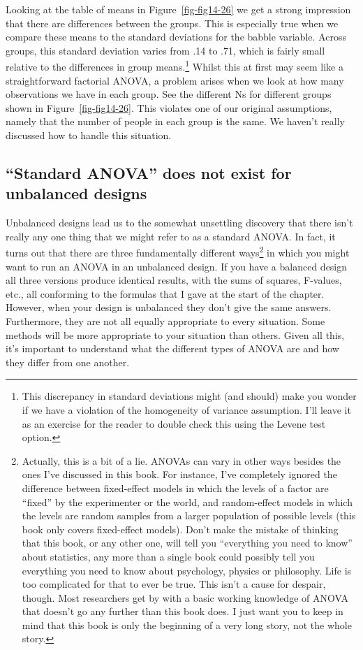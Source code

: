 \documentclass[
  a4paper,
]{book}
\begin{document}
Looking at the table of means in Figure~\ref{fig-fig14-26} we get a
strong impression that there are differences between the groups. This is
especially true when we compare these means to the standard deviations
for the babble variable. Across groups, this standard deviation varies
from .14 to .71, which is fairly small relative to the differences in
group means.\footnote{This discrepancy in standard deviations might (and
  should) make you wonder if we have a violation of the homogeneity of
  variance assumption. I'll leave it as an exercise for the reader to
  double check this using the Levene test option.} Whilst this at first
may seem like a straightforward factorial ANOVA, a problem arises when
we look at how many observations we have in each group. See the
different Ns for different groups shown in Figure~\ref{fig-fig14-26}.
This violates one of our original assumptions, namely that the number of
people in each group is the same. We haven't really discussed how to
handle this situation.

\hypertarget{standard-anova-does-not-exist-for-unbalanced-designs}{%
\subsection{``Standard ANOVA'' does not exist for unbalanced
designs}\label{standard-anova-does-not-exist-for-unbalanced-designs}}

Unbalanced designs lead us to the somewhat unsettling discovery that
there isn't really any one thing that we might refer to as a standard
ANOVA. In fact, it turns out that there are three fundamentally
different ways\footnote{Actually, this is a bit of a lie. ANOVAs can
  vary in other ways besides the ones I've discussed in this book. For
  instance, I've completely ignored the difference between fixed-effect
  models in which the levels of a factor are ``fixed'' by the
  experimenter or the world, and random-effect models in which the
  levels are random samples from a larger population of possible levels
  (this book only covers fixed-effect models). Don't make the mistake of
  thinking that this book, or any other one, will tell you ``everything
  you need to know'' about statistics, any more than a single book could
  possibly tell you everything you need to know about psychology,
  physics or philosophy. Life is too complicated for that to ever be
  true. This isn't a cause for despair, though. Most researchers get by
  with a basic working knowledge of ANOVA that doesn't go any further
  than this book does. I just want you to keep in mind that this book is
  only the beginning of a very long story, not the whole story.} in
which you might want to run an ANOVA in an unbalanced design. If you
have a balanced design all three versions produce identical results,
with the sums of squares, F-values, etc., all conforming to the formulas
that I gave at the start of the chapter. However, when your design is
unbalanced they don't give the same answers. Furthermore, they are not
all equally appropriate to every situation. Some methods will be more
appropriate to your situation than others. Given all this, it's
important to understand what the different types of ANOVA are and how
they differ from one another.
\end{document}
